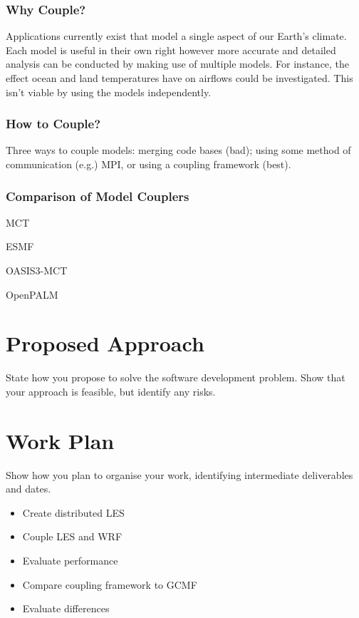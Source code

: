 \documentclass{acm_proc_article-sp}
\begin{document}
\subsubsection*{Why Couple?}

Applications currently exist that model a single aspect of our Earth's climate.
Each model is useful in their own right however more accurate and detailed
analysis can be conducted by making use of multiple models. For instance, the
effect ocean and land temperatures have on airflows could be investigated. This
isn't viable by using the models independently.

\subsubsection*{How to Couple?}

Three ways to couple models: merging code bases (bad); using some method of
communication (e.g.) MPI, or using a coupling framework (best).

\subsubsection*{Comparison of Model Couplers}

MCT

ESMF

OASIS3-MCT

OpenPALM

\section*{Proposed Approach}

State how you propose to solve the software development problem. Show that your
approach is feasible, but identify any risks.

\section*{Work Plan}

Show how you plan to organise your work, identifying intermediate deliverables
and dates.

\begin{itemize}
	\item Create distributed LES
	\item Couple LES and WRF
	\item Evaluate performance
	\item Compare coupling framework to GCMF
	\item Evaluate differences
\end{itemize}



\end{document}
